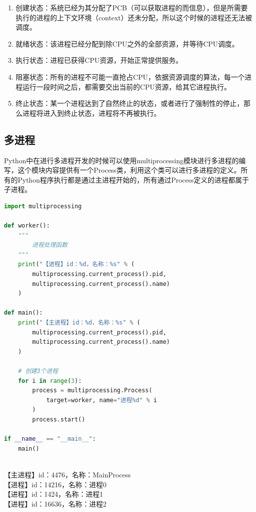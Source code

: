 \begin{enumerate}
	\item 创建状态：系统已经为其分配了PCB（可以获取进程的而信息），但是所需要执行的进程的上下文环境（context）还未分配，所以这个时候的进程还无法被调度。

	\item 就绪状态：该进程已经分配到除CPU之外的全部资源，并等待CPU调度。

	\item 执行状态：进程已获得CPU资源，开始正常提供服务。

	\item 阻塞状态：所有的进程不可能一直抢占CPU，依据资源调度的算法，每一个进程运行一段时间之后，都需要交出当前的CPU资源，给其它进程执行。

	\item 终止状态：某一个进程达到了自然终止的状态，或者进行了强制性的停止，那么进程将进入到终止状态，进程将不再被执行。
\end{enumerate}

\subsection{多进程}

Python中在进行多进程开发的时候可以使用multiprocessing模块进行多进程的编写，这个模块内容提供有一个Process类，利用这个类可以进行多进程的定义。所有的Python程序执行都是通过主进程开始的，所有通过Process定义的进程都属于子进程。 \\

\begin{lstlisting}[language=Python]
import multiprocessing

def worker():
	"""
		进程处理函数
	"""
	print("【进程】id：%d，名称：%s" % (
		multiprocessing.current_process().pid,
		multiprocessing.current_process().name)
	)

def main():
	print("【主进程】id：%d，名称：%s" % (
		multiprocessing.current_process().pid,
		multiprocessing.current_process().name)
	)

	# 创建3个进程
	for i in range(3):
		process = multiprocessing.Process(
			target=worker, name="进程%d" % i
		)
		process.start()

if __name__ == "__main__":
	main()
\end{lstlisting}

\begin{tcolorbox}
	 \\
	【主进程】id：4476，名称：MainProcess \\
	【进程】id：14216，名称：进程0 \\
	【进程】id：1424，名称：进程1 \\
	【进程】id：16636，名称：进程2
\end{tcolorbox}

